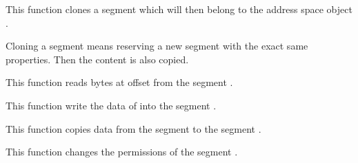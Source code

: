 \begin{itemize}
             {
               This function clones a segment which will then belong to
               the address space object .

               Cloning a segment means reserving a new segment with the
               exact same properties. Then the content is also copied.
             }

             {
               This function reads  bytes at offset
                from the segment .
             }

              {
		This function write the data of  into the
		segment .
              }

             {
               This function copies data from the segment  to
               the segment .
             }

             {
               This function changes the permissions of the segment .
             }
\end{itemize}


%
%

\newpage

